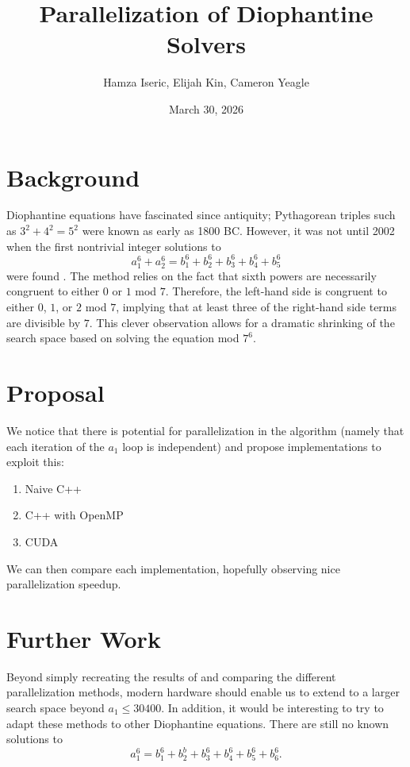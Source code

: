 \documentclass[11pt, letterpaper]{article}
\title{Parallelization of Diophantine Solvers}
\author{Hamza Iseric, Elijah Kin, Cameron Yeagle}
\date{March 30, 2026}
\begin{document}
\maketitle

\section*{Background}
Diophantine equations have fascinated since antiquity; Pythagorean triples such as $3^2 + 4^2 = 5^2$ were known as early as 1800 BC. However, it was not until 2002 when the first nontrivial integer solutions to
\begin{equation*}
    a_1^6 + a_2^6 = b_1^6 + b_2^6 + b_3^6 + b_4^6 + b_5^6
\end{equation*}
were found \cite{RM03}. The method relies on the fact that sixth powers are necessarily congruent to either $0$ or $1$ mod $7$. Therefore, the left-hand side is congruent to either $0$, $1$, or $2$ mod $7$, implying that at least three of the right-hand side terms are divisible by $7$. This clever observation allows for a dramatic shrinking of the search space based on solving the equation mod $7^6$.

\section*{Proposal}
We notice that there is potential for parallelization in the algorithm (namely that each iteration of the $a_1$ loop is independent) and propose implementations to exploit this:
\begin{enumerate}[label=\roman*]
    \item Naive C++
    \item C++ with OpenMP
    \item CUDA
\end{enumerate}
We can then compare each implementation, hopefully observing nice parallelization speedup.

\section*{Further Work}
Beyond simply recreating the results of \cite{RM03} and comparing the different parallelization methods, modern hardware should enable us to extend to a larger search space beyond $a_1 \leq 30400$. In addition, it would be interesting to try to adapt these methods to other Diophantine equations. There are still no known solutions to
\begin{equation*}
    a_1^6 = b_1^6 + b_2^b + b_3^6 + b_4^6 + b_5^6 + b_6^6.
\end{equation*}



\end{document}

